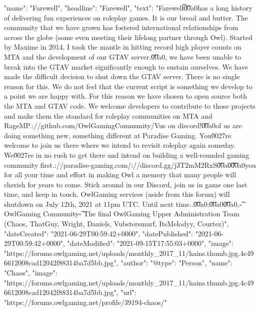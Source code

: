 {
    "name": "Farewell",
    "headline": "Farewell",
    "text": "Farewell\n\t \n\n\n\n\t\u00a0\n \n\n\n\tOwlGaming has a long history of delivering fun experiences on roleplay games. It is our bread and butter. The community that we have grown has fostered international relationships from across the globe (some even meeting their lifelong partner through Owl). Started by Maxime in 2014, I took the mantle in hitting record high player counts on MTA and the development of our GTAV server.\n \n\n\n\t\u00a0\n \n\n\n\tUnfortunately, we have been unable to break into the GTAV market significantly enough to sustain ourselves. We have made the difficult decision to shut down the GTAV server. There is no single reason for this. We do not feel that the current script is something we develop to a point we are happy with. For this reason we have chosen to open source both the MTA and GTAV code. We welcome developers to contribute to those projects and make them the standard for roleplay communities on MTA and RageMP.\n \n\n\n\thttps://github.com/OwlGamingCommunity/V\n \n\n\n\tJoin us on discord!\n \n\n\n\t\u00a0\n \n\n\n\tSome of us are doing something new, something different at Paradise Gaming. You\u0027re welcome to join us there where we intend to revisit roleplay again someday. We\u0027re in no rush to get there and intend on building a well-rounded gaming community first.\n \n\n\n\thttps://paradise-gaming.com/\n \n\n\n\thttps://discord.gg/j3T2mM2RxS\n \n\n\n\t\u00a0\n \n\n\n\t \n\n\n\t\u00a0\n \n\n\n\tThank you for all your time and effort in making Owl a memory that many people will cherish for years to come. Stick around in our Discord, join us in game one last time, and keep in touch. OwlGaming services (aside from this forum) will shutdown on July 12th, 2021 at 11pm UTC. Until next time..\n \n\n\n\t\u00a0\n \n\n\n\tStats:\n \n\n\n\t\u00a0\n \n\n\n\n\n\t\u00a0\n \n\n\n\tRegards,\n \n\n\n\t- OwlGaming Community\n \n\n\n\t- The final OwlGaming Upper Administration Team (Chaos, ThatGuy, Wright, Daniels, Vubstersmurf, ItsMelodyy, Courtez)\n \n",
    "dateCreated": "2021-06-29T00:59:42+0000",
    "datePublished": "2021-06-29T00:59:42+0000",
    "dateModified": "2021-09-15T17:55:03+0000",
    "image": "https://forums.owlgaming.net/uploads/monthly_2017_11/hains.thumb.jpg.4c496612008cad12042f88314ba7d5bb.jpg",
    "author": {
        "@type": "Person",
        "name": "Chaos",
        "image": "https://forums.owlgaming.net/uploads/monthly_2017_11/hains.thumb.jpg.4c496612008cad12042f88314ba7d5bb.jpg",
        "url": "https://forums.owlgaming.net/profile/39194-chaos/"
}}
